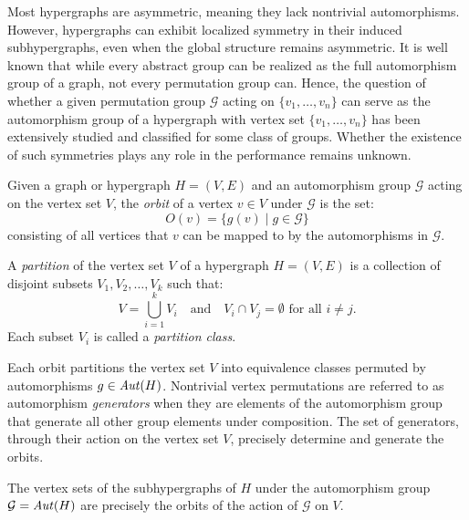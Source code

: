 Most hypergraphs are asymmetric, meaning they lack nontrivial automorphisms. However, hypergraphs can exhibit localized symmetry in their induced subhypergraphs, even when the global structure remains asymmetric. It is well known that while every abstract group can be realized as the full automorphism group of a graph, not every permutation group can. Hence, the question of whether a given permutation group $\mathcal{G}$ acting on $\{v_1,\dots,v_n\}$ can serve as the automorphism group of a hypergraph with vertex set $\{v_1,\dots,v_n\}$ has been extensively studied and classified for some class of groups. Whether the existence of such symmetries plays any role in the \FKA{} performance remains unknown.

\begin{definition}
Given a graph or hypergraph $H=(V,E)$ and an automorphism group $\mathcal{G}$ acting on the vertex set $V$, the \emph{orbit} of a vertex $v\in V$ under $\mathcal{G}$ is the set:
\[
O(v)=\{g(v)\mid g\in\mathcal{G}\}
\]
consisting of all vertices that $v$ can be mapped to by the automorphisms in $\mathcal{G}$.
\end{definition}

\begin{definition}
A \emph{partition} of the vertex set $V$ of a hypergraph $H=(V,E)$ is a collection of disjoint subsets $V_1,V_2,\dots,V_k$ such that:
\[
V=\bigcup_{i=1}^{k}V_i\quad\text{and}\quad V_i\cap V_j=\emptyset\text{ for all }i\neq j.
\]
Each subset $V_i$ is called a \emph{partition class}.
\end{definition}

Each orbit partitions the vertex set $V$ into equivalence classes permuted by automorphisms $g\in\mathit{Aut}(H)$. Nontrivial vertex permutations are referred to as automorphism \emph{generators} when they are elements of the automorphism group that generate all other group elements under composition. The set of generators, through their action on the vertex set $V$, precisely determine and generate the orbits.

\begin{claim}
The vertex sets of the subhypergraphs of $H$ under the automorphism group $\mathcal{G}=\mathit{Aut}(H)$ are precisely the orbits of the action of $\mathcal{G}$ on $V$. \cite{Lec}
\end{claim}

